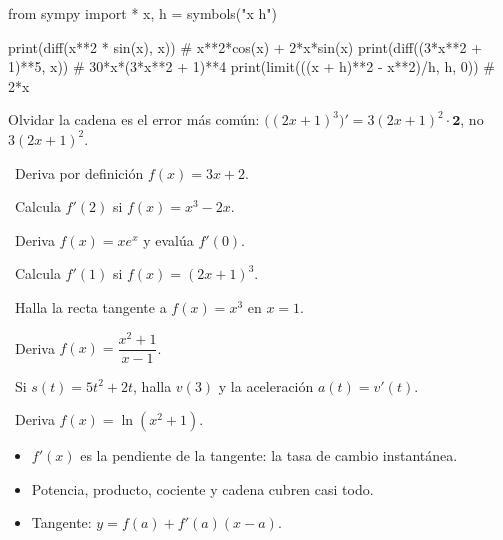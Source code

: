 \begin{tmcodigo}
from sympy import *
x, h = symbols("x h")

print(diff(x**2 * sin(x), x))           # x**2*cos(x) + 2*x*sin(x)
print(diff((3*x**2 + 1)**5, x))         # 30*x*(3*x**2 + 1)**4
print(limit(((x + h)**2 - x**2)/h, h, 0))   # 2*x
\end{tmcodigo}

\begin{tmcuidado}Olvidar la cadena es el error m\'as com\'un: $\big((2x+1)^3\big)'=3(2x+1)^2\cdot\textbf{2}$, no $3(2x+1)^2$.\end{tmcuidado}

\begin{tmejercicios}
\label{ej:4-2}
\begin{tmlista}
\item \tmbasico\ Deriva por definici\'on $f(x)=3x+2$.
\item \tmbasico\ Calcula $f'(2)$ si $f(x)=x^3-2x$.
\item \tmbasico\ Deriva $f(x)=xe^x$ y eval\'ua $f'(0)$.
\item \tmmedio\ Calcula $f'(1)$ si $f(x)=(2x+1)^3$.
\item \tmmedio\ Halla la recta tangente a $f(x)=x^3$ en $x=1$.
\item \tmmedio\ Deriva $f(x)=\dfrac{x^2+1}{x-1}$.
\item \tmdificil\ Si $s(t)=5t^2+2t$, halla $v(3)$ y la aceleraci\'on $a(t)=v'(t)$.
\item \tmdificil\ Deriva $f(x)=\ln(x^2+1)$.
\end{tmlista}
\end{tmejercicios}


\begin{tmresumen}
\begin{itemize}
\item $f'(x)$ es la pendiente de la tangente: la tasa de cambio instant\'anea.
\item Potencia, producto, cociente y cadena cubren casi todo.
\item Tangente: $y=f(a)+f'(a)(x-a)$.
\end{itemize}
\end{tmresumen}


